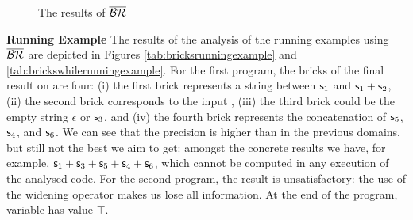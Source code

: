 \documentclass[orivec]{llncs}
\begin{document}
\begin{figure}[t]
\begin{center}
\goodgap
{}
\end{center}
\caption{The results of $\mathsf{\overline{\mathsf{\mathcal{BR}}}}$}
\end{figure}

\noindent \textbf{Running Example } The results of the analysis of the running examples using $\mathsf{\overline{\mathsf{\mathcal{BR}}}}$ are depicted in Figures \ref{tab:bricksrunningexample} and \ref{tab:brickswhilerunningexample}. 
For the first program, the bricks of the final result on  are four: (i) the first brick represents a string between $\mathsf{s}_1$ and $\mathsf{s}_1 + \mathsf{s}_2$, (ii) the second brick corresponds to the input , (iii) the third brick could be the empty string $\epsilon$ or $\mathsf{s}_3$, and (iv) the fourth brick represents the concatenation of $\mathsf{s}_5$, $\mathsf{s}_4$, and $\mathsf{s}_6$.
We can see that the precision is higher than in the previous domains, but still not the best we aim to get: amongst the concrete results we have, for example, $\mathsf{s}_1 + \mathsf{s}_3 + \mathsf{s}_5 + \mathsf{s}_4 + \mathsf{s}_6$, which cannot be computed in any execution of the analysed code.
For the second program, the result is unsatisfactory: the use of the widening operator makes us lose all information. At the end of the program, variable  has value $\top$.
\end{document}
